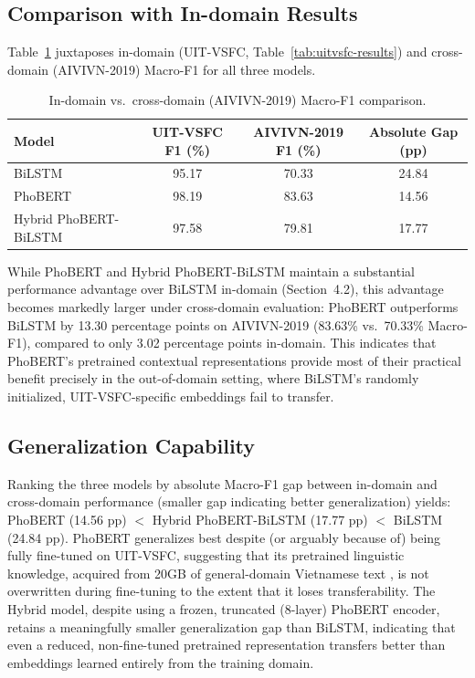 \documentclass[12pt]{report} %
\begin{document}
\subsection{Comparison with In-domain Results}
Table~\ref{tab:indomain-vs-aivivn} juxtaposes in-domain (UIT-VSFC, Table~\ref{tab:uitvsfc-results}) and cross-domain (AIVIVN-2019) Macro-F1 for all three models.

\begin{table}[htbp]
    \centering
    \caption{In-domain vs.\ cross-domain (AIVIVN-2019) Macro-F1 comparison.}
    \label{tab:indomain-vs-aivivn}
    \begin{tabular}{lccc}
        \hline
        \textbf{Model}        & \textbf{UIT-VSFC F1 (\%)} & \textbf{AIVIVN-2019 F1 (\%)} & \textbf{Absolute Gap (pp)} \\
        \hline
        BiLSTM                & 95.17                     & 70.33                        & 24.84                      \\
        PhoBERT               & 98.19                     & 83.63                        & 14.56                      \\
        Hybrid PhoBERT-BiLSTM & 97.58                     & 79.81                        & 17.77                      \\
        \hline
    \end{tabular}
\end{table}

While PhoBERT and Hybrid PhoBERT-BiLSTM maintain a substantial performance advantage over BiLSTM in-domain (Section~4.2), this advantage becomes markedly larger under cross-domain evaluation: PhoBERT outperforms BiLSTM by 13.30 percentage points on AIVIVN-2019 (83.63\% vs.\ 70.33\% Macro-F1), compared to only 3.02 percentage points in-domain. This indicates that PhoBERT's pretrained contextual representations provide most of their practical benefit precisely in the out-of-domain setting, where BiLSTM's randomly initialized, UIT-VSFC-specific embeddings fail to transfer.

\subsection{Generalization Capability}
Ranking the three models by absolute Macro-F1 gap between in-domain and cross-domain performance (smaller gap indicating better generalization) yields: PhoBERT (14.56 pp) $<$ Hybrid PhoBERT-BiLSTM (17.77 pp) $<$ BiLSTM (24.84 pp). PhoBERT generalizes best despite (or arguably because of) being fully fine-tuned on UIT-VSFC, suggesting that its pretrained linguistic knowledge, acquired from 20GB of general-domain Vietnamese text \cite{nguyen2020phobertpretrainedlanguagemodels}, is not overwritten during fine-tuning to the extent that it loses transferability. The Hybrid model, despite using a frozen, truncated (8-layer) PhoBERT encoder, retains a meaningfully smaller generalization gap than BiLSTM, indicating that even a reduced, non-fine-tuned pretrained representation transfers better than embeddings learned entirely from the training domain.
\end{document}
